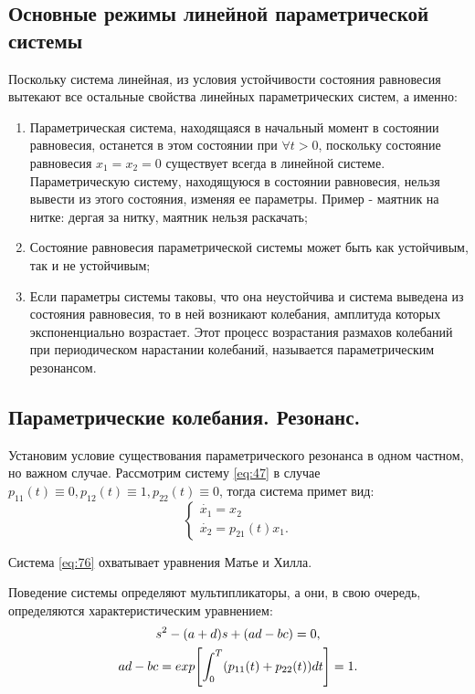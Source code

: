 \subsection{Основные режимы линейной параметрической системы}

Поскольку система линейная, из условия устойчивости состояния равновесия вытекают все остальные свойства линейных параметрических систем, а именно:
\begin{enumerate} 
	\item Параметрическая система, находящаяся в начальный момент в состоянии равновесия, останется в этом состоянии при $\forall t>0$, поскольку состояние равновесия $x_1=x_2=0$ существует всегда в линейной системе. Параметрическую систему, находящуюся в состоянии равновесия, нельзя вывести из этого состояния, изменяя ее параметры. Пример - маятник на нитке: дергая за нитку, маятник нельзя раскачать;
	\item Состояние равновесия параметрической системы может быть как устойчивым, так и не устойчивым;
	\item Если параметры системы таковы, что она неустойчива и система выведена из состояния равновесия, то в ней возникают колебания, амплитуда которых экспоненциально возрастает. Этот процесс возрастания размахов колебаний при периодическом нарастании колебаний, называется параметрическим резонансом.
\end{enumerate} 

\subsection{Параметрические колебания. Резонанс.}
Установим условие существования параметрического резонанса в одном частном, но важном случае. Рассмотрим систему \eqref{eq:47} в случае $p_{11}(t) \equiv0, p_{12}(t)\equiv 1, p_{22}(t) \equiv 0$, тогда система примет вид:
\begin{equation}
	\begin{cases}
		\dot{x_1}=x_2 \\
		\dot{x_2}=p_{21}(t)x_1.
	\end{cases}
	\label{eq:76}
\end{equation}

Система \eqref{eq:76} охватывает уравнения Матье и Хилла. 

Поведение системы определяют мультипликаторы, а они, в свою очередь, определяются характеристическим уравнением:
\begin{gather*}
	s^2-(a+d)s+(ad-bc)=0, \\
	ad-bc=exp\qty[\int_0^T(p_{11}(t)+p_{22}(t))dt]=1.		
\end{gather*}

